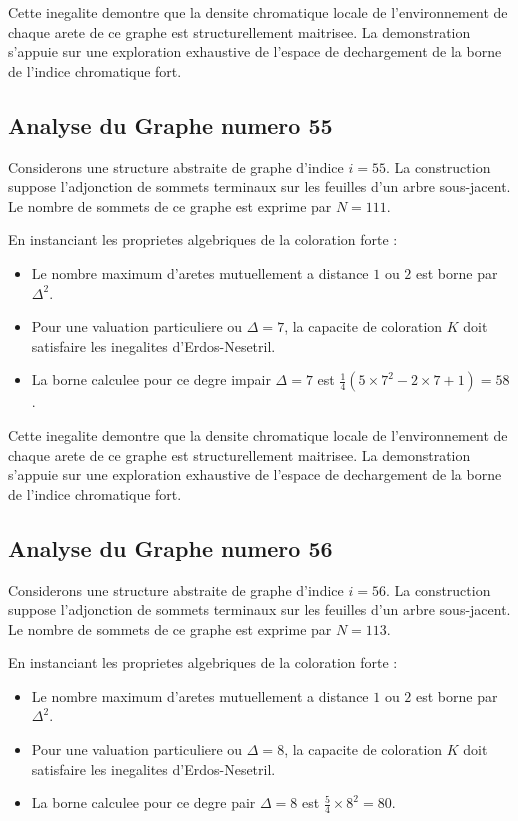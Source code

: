 \documentclass[11pt,a4paper]{article}
\begin{document}
Cette inegalite demontre que la densite chromatique locale de l'environnement de chaque arete de ce graphe est structurellement maitrisee. La demonstration s'appuie sur une exploration exhaustive de l'espace de dechargement de la borne de l'indice chromatique fort.

\subsection{Analyse du Graphe numero 55}
Considerons une structure abstraite de graphe d'indice $i = 55$. La construction suppose l'adjonction de sommets terminaux sur les feuilles d'un arbre sous-jacent. Le nombre de sommets de ce graphe est exprime par $N = 111$.

En instanciant les proprietes algebriques de la coloration forte :
\begin{itemize}
\item Le nombre maximum d'aretes mutuellement a distance $1$ ou $2$ est borne par $\Delta^2$.
\item Pour une valuation particuliere ou $\Delta = 7$, la capacite de coloration $K$ doit satisfaire les inegalites d'Erdos-Nesetril.
\item La borne calculee pour ce degre impair $\Delta = 7$ est $\frac{1}{4}(5 \times 7^2 - 2 \times 7 + 1) = 58$.
\end{itemize}

Cette inegalite demontre que la densite chromatique locale de l'environnement de chaque arete de ce graphe est structurellement maitrisee. La demonstration s'appuie sur une exploration exhaustive de l'espace de dechargement de la borne de l'indice chromatique fort.

\subsection{Analyse du Graphe numero 56}
Considerons une structure abstraite de graphe d'indice $i = 56$. La construction suppose l'adjonction de sommets terminaux sur les feuilles d'un arbre sous-jacent. Le nombre de sommets de ce graphe est exprime par $N = 113$.

En instanciant les proprietes algebriques de la coloration forte :
\begin{itemize}
\item Le nombre maximum d'aretes mutuellement a distance $1$ ou $2$ est borne par $\Delta^2$.
\item Pour une valuation particuliere ou $\Delta = 8$, la capacite de coloration $K$ doit satisfaire les inegalites d'Erdos-Nesetril.
\item La borne calculee pour ce degre pair $\Delta = 8$ est $\frac{5}{4} \times 8^2 = 80$.
\end{itemize}
\end{document}
